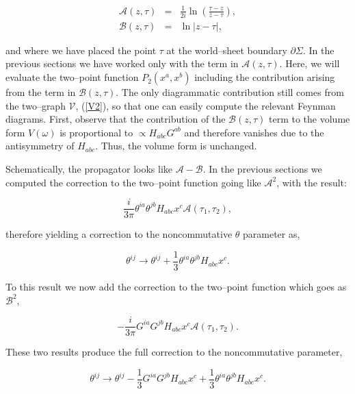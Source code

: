 \documentclass[a4paper,11pt]{article}
\begin{document}
\begin{eqnarray*}
\mathcal{A} \left( z,\tau \right) &=& \frac{1}{2i} \ln \left( \frac{\tau - 
z}{\overline{z} - \tau} \right), \\
\mathcal{B} \left( z,\tau \right) &=& \ln \left|z - \tau \right|,
\end{eqnarray*}

\noindent 
and where we have placed the point $\tau$ at the world--sheet boundary
$\partial\Sigma$. In the previous sections we have worked only with the
term in $\mathcal{A}(z,\tau)$. Here, we will evaluate the two--point
function $P_{2} (x^{a}, x^{b})$ including the contribution arising from the
term in $\mathcal{B}(z,\tau)$. The only diagrammatic contribution still
comes from the two--graph $\mathcal{V}$, (\ref{V2}), so that one can easily
compute the relevant Feynman diagrams. First, observe that the contribution
of the $\mathcal{B}(z,\tau)$ term to the volume form $V(\omega)$ is
proportional to $\propto H_{abc} G^{ab}$ and therefore vanishes due to the
antisymmetry of $H_{abc}$. Thus, the volume form is unchanged.

Schematically, the propagator looks like $\mathcal{A}-\mathcal{B}$. In the
previous sections we computed the correction to the two--point function
going like $\mathcal{A}^{2}$, with the result:

$$
{\frac{i }{3\pi}} \theta^{ia} \theta^{jb} H_{abc} x^{c} \mathcal{A} \left( 
\tau_{1},\tau_{2} \right),
$$

\noindent
therefore yielding a correction to the noncommutative $\theta$
parameter as,

\begin{equation}
\theta^{ij} \to \theta^{ij} + {\frac{1}{3}} \theta^{ia} \theta^{jb} H_{abc}
x^{c}.
\end{equation}

\noindent 
To this result we now add the correction to the two--point function which
goes as $\mathcal{B}^{2}$,

$$
- {\frac{i }{3\pi}} G^{ia} G^{jb} H_{abc} x^{c} \mathcal{A} \left( 
\tau_{1},\tau_{2} \right).
$$

\noindent 
These two results produce the full correction to the noncommutative
parameter,

\begin{equation}  \label{correction-theta}
\theta^{ij} \to \theta^{ij} - {\frac{1}{3}} G^{ia} G^{jb} H_{abc} x^{c} + 
{\frac{1}{3}} \theta^{ia} \theta^{jb} H_{abc} x^{c}.
\end{equation}
\end{document}
